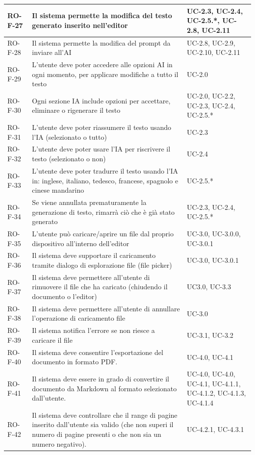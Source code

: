 \documentclass[11pt,a4paper]{article}
\begin{document}
\begin{longtable}{|p{}|>{\raggedright\arraybackslash}p{}|p{}|}
\hline
RO-F-27 & Il sistema permette la modifica del testo generato inserito nell'editor & UC-2.3, UC-2.4, UC-2.5.*, UC-2.8, UC-2.11 \\
\hline
RO-F-28 & Il sistema permette la modifica del prompt da inviare all'AI & UC-2.8, UC-2.9, UC-2.10, UC-2.11 \\
\hline
RO-F-29 & L'utente deve poter accedere alle opzioni AI in ogni momento, per applicare modifiche a tutto il testo & UC-2.0 \\
\hline
RO-F-30 & Ogni sezione IA include opzioni per accettare, eliminare o rigenerare il testo & UC-2.0, UC-2.2, UC-2.3, UC-2.4, UC-2.5.* \\
\hline
RO-F-31 & L'utente deve poter riassumere il testo usando l'IA (selezionato o tutto) & UC-2.3 \\
\hline
RO-F-32 & L'utente deve poter usare l'IA per riscrivere il testo (selezionato o non) & UC-2.4 \\
\hline
RO-F-33 & L'utente deve poter tradurre il testo usando l'IA in: inglese, italiano, tedesco, francese, spagnolo e cinese mandarino & UC-2.5.* \\
\hline
RO-F-34 & Se viene annullata prematuramente la generazione di testo, rimarrà ciò che è già stato generato & UC-2.3, UC-2.4, UC-2.5.* \\
\hline
RO-F-35 & L'utente può caricare/aprire un file dal proprio dispositivo all'interno dell'editor & UC-3.0, UC-3.0.0, UC-3.0.1 \\
\hline
RO-F-36 & Il sistema deve supportare il caricamento tramite dialogo di esplorazione file (file picker) & UC-3.0, UC-3.0.1 \\
\hline
RO-F-37 & Il sistema deve permettere all'utente di rimuovere il file che ha caricato (chiudendo il documento o l'editor) & UC3.0, UC-3.3 \\
\hline
RO-F-38 & Il sistema deve permettere all'utente di annullare l'operazione di caricamento file & UC-3.0 \\
\hline
RO-F-39 & Il sistema notifica l'errore se non riesce a caricare il file & UC-3.1, UC-3.2\\
\hline
RO-F-40 & Il sistema deve consentire l'esportazione del documento in formato PDF. & UC-4.0, UC-4.1\\
\hline
RO-F-41 & Il sistema deve essere in grado di convertire il documento da Markdown al formato selezionato dall'utente. & UC-4.0, UC-4.0, UC-4.1, UC-4.1.1, UC-4.1.2, UC-4.1.3, UC-4.1.4\\
\hline
RO-F-42 & Il sistema deve controllare che il range di pagine inserito dall'utente sia valido (che non superi il numero di pagine presenti o che non sia un numero negativo). & UC-4.2.1, UC-4.3.1\\

\end{longtable}
\end{document}
